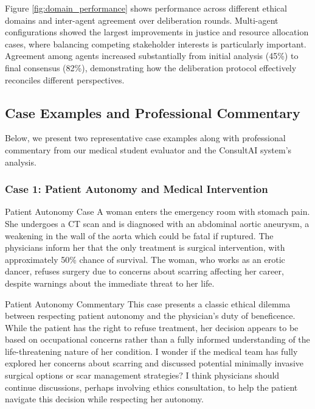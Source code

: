 \documentclass[11pt]{article}
\begin{document}
Figure \ref{fig:domain_performance} shows performance across different ethical domains and inter-agent agreement over deliberation rounds. Multi-agent configurations showed the largest improvements in justice and resource allocation cases, where balancing competing stakeholder interests is particularly important. Agreement among agents increased substantially from initial analysis (45\%) to final consensus (82\%), demonstrating how the deliberation protocol effectively reconciles different perspectives.

\subsection{Case Examples and Professional Commentary}

Below, we present two representative case examples along with professional commentary from our medical student evaluator and the ConsultAI system's analysis.

\subsubsection{Case 1: Patient Autonomy and Medical Intervention}

\begin{casebox}{Patient Autonomy Case}
A woman enters the emergency room with stomach pain. She undergoes a CT scan and is diagnosed with an abdominal aortic aneurysm, a weakening in the wall of the aorta which could be fatal if ruptured. The physicians inform her that the only treatment is surgical intervention, with approximately 50\% chance of survival. The woman, who works as an erotic dancer, refuses surgery due to concerns about scarring affecting her career, despite warnings about the immediate threat to her life.
\end{casebox}

\begin{commentarybox}{Patient Autonomy Commentary} 
This case presents a classic ethical dilemma between respecting patient autonomy and the physician's duty of beneficence. While the patient has the right to refuse treatment, her decision appears to be based on occupational concerns rather than a fully informed understanding of the life-threatening nature of her condition. I wonder if the medical team has fully explored her concerns about scarring and discussed potential minimally invasive surgical options or scar management strategies? I think physicians should continue discussions, perhaps involving ethics consultation, to help the patient navigate this decision while respecting her autonomy.
\end{commentarybox}
\end{document}
